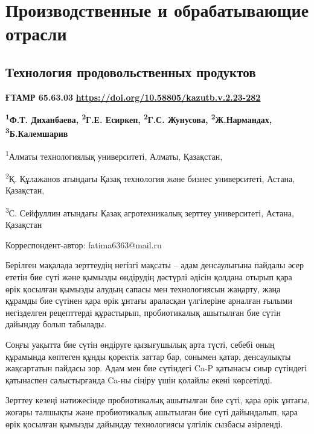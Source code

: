 \newpage
{}
\let\cleardoublepage\clearpage
\part{Производственные и обрабатывающие отрасли}
\chapter{Технология продовольственных продуктов}

{\bfseries ҒТАМР 65.63.03}
\hfill {\bfseries \href{https://doi.org/10.58805/kazutb.v.2.23-282}{https://doi.org/10.58805/kazutb.v.2.23-282}}


\begin{center}
{\bfseries \textsuperscript{1}Ф.Т. Диханбаева\envelope, \textsuperscript{2}Г.Е. Есиркеп, \textsuperscript{2}Г.С. Жунусова, \textsuperscript{2}Ж.Нармандах, \textsuperscript{3}Б.Калемшарив}

\textsuperscript{1}Алматы технологиялық университеті, Алматы, Қазақстан,

\textsuperscript{2}Қ. Құлажанов атындағы Қазақ технология және бизнес
университеті, Астана, Қазақстан,

\textsuperscript{3}С. Сейфуллин атындағы Қазақ агротехникалық зерттеу
университеті, Астана, Қазақстан

\envelope Корреспондент-автор: fatima6363@mail.ru
\end{center}

Берілген мақалада зерттеудің негізгі мақсаты -- адам денсаулығына
пайдалы әсер ететін бие сүті және қымызды өндірудің дәстүрлі әдісін
қолдана отырып қара өрік қосылған қымызды алудың сапасы мен
технологиясын жаңарту, жаңа құрамды бие сүтінен қара өрік ұнтағы
араласқан үлгілеріне арналған ғылыми негізделген рецепттерді құрастырып,
пробиотикалық ашытылған бие сүтін дайындау болып табылады.

Соңғы уақытта бие сүтін өндіруге қызығушылық арта түсті, себебі оның
құрамында көптеген құнды қоректік заттар бар, сонымен қатар, денсаулықты
жақсартатын пайдасы зор. Адам мен бие сүтіндегі Ca-P қатынасы сиыр
сүтіндегі қатынаспен салыстырғанда Ca-ны сіңіру үшін қолайлы екені
көрсетілді.

Зерттеу кезеңі нәтижесінде пробиотикалық ашытылған бие сүті, қара өрік
ұнтағы, жоғары талшықты және пробиотикалық ашытылған бие сүті
дайындалып, қара өрік қосылған қымызды дайындау технологиясы үлгілік
сызбасы әзірленді.

